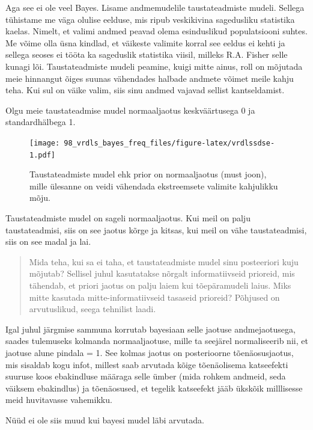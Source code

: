 \documentclass[]{book}
\begin{document}
Aga see ei ole veel Bayes. Lisame andmemudelile taustateadmiste mudeli.
Sellega tühistame me väga olulise eelduse, mis ripub veskikivina
sagedusliku statistika kaelas. Nimelt, et valimi andmed peavad olema
esinduslikud populatsiooni suhtes. Me võime olla üsna kindlad, et
väikeste valimite korral see eeldus ei kehti ja sellega seoses ei tööta
ka sageduslik statistika viisil, milleks R.A. Fisher selle kunagi lõi.
Taustateadmiste mudeli peamine, kuigi mitte ainus, roll on mõjutada meie
hinnangut õiges suunas vähendades halbade andmete võimet meile kahju
teha. Kui sul on väike valim, siis sinu andmed vajavad sellist
kantseldamist.

Olgu meie taustateadmise mudel normaaljaotus keskväärtusega 0 ja
standardhälbega 1.

\begin{figure}
\centering
\texttt{[image: 98\_vrdls\_bayes\_freq\_files/figure-latex/vrdlssdse-1.pdf]}
\caption{\label{fig:vrdlssdse}Taustateadmiste mudel ehk prior on
normaaljaotus (must joon), mille ülesanne on veidi vähendada
ekstreemsete valimite kahjulikku mõju.}
\end{figure}

Taustateadmiste mudel on sageli normaaljaotus. Kui meil on palju
taustateadmisi, siis on see jaotus kõrge ja kitsas, kui meil on vähe
taustateadmisi, siis on see madal ja lai.

\begin{quote}
Mida teha, kui sa ei taha, et taustateadmiste mudel sinu posteeriori
kuju mõjutab? Sellisel juhul kasutatakse nõrgalt informatiivseid
prioreid, mis tähendab, et priori jaotus on palju laiem kui
tõepäramudeli laius. Miks mitte kasutada mitte-informatiivseid tasaseid
prioreid? Põhjused on arvutuslikud, seega tehnilist laadi.
\end{quote}

Igal juhul järgmise sammuna korrutab bayesiaan selle jaotuse
andmejaotusega, saades tulemuseks kolmanda normaaljaotuse, mille ta
seejärel normaliseerib nii, et jaotuse alune pindala = 1. See kolmas
jaotus on posterioorne tõenäosusjaotus, mis sisaldab kogu infot, millest
saab arvutada kõige tõenäolisema katseefekti suuruse koos ebakindluse
määraga selle ümber (mida rohkem andmeid, seda väiksem ebakindlus) ja
tõenäosused, et tegelik katseefekt jääb ükskõik milllisesse meid
huvitavasse vahemikku.

Nüüd ei ole siis muud kui bayesi mudel läbi arvutada.
\end{document}
